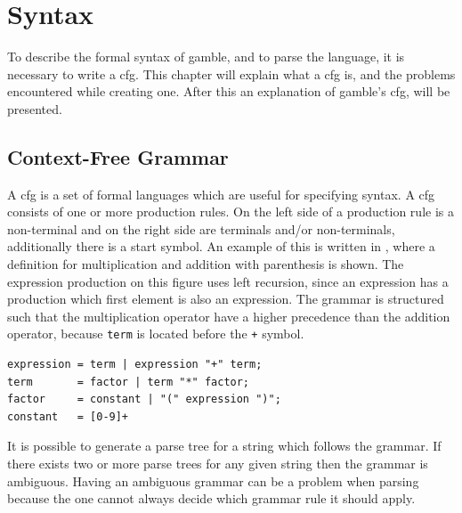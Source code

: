 \chapter{Syntax}\label{chap:syntax}

To describe the formal syntax of \gls{gamble}, and to parse the language, it is necessary to write a \acrfull{cfg}.
This chapter will explain what a \acrshort{cfg} is, and the problems encountered while creating one.
After this an explanation of \gls{gamble}'s \acrshort{cfg}, will be presented.

\section{Context-Free Grammar}\label{sec:cfg}
A \acrshort{cfg} is a set of formal languages which are useful for specifying syntax. 
A \acrshort{cfg} consists of one or more production rules.
On the left side of a production rule is a non-terminal and on the right side are terminals and/or non-terminals, additionally there is a start symbol.
An example of this is written in , where a definition for multiplication and addition with parenthesis is shown.
The expression production on this figure uses left recursion, since an expression has a production which first element is also an expression.
The grammar is structured such that the multiplication operator have a higher precedence than the addition operator, because \texttt{term} is located before the \texttt{+} symbol.

\begin{lstlisting}[caption={An example of a \acrshort{cfg} written in \acrshort{ebnf}, with \acrshort{regex} for defining numbers. },frame=tlrb,label={lst:cfglst1},numbers=none]
expression = term | expression "+" term;
term       = factor | term "*" factor;
factor     = constant | "(" expression ")";
constant   = [0-9]+
\end{lstlisting}

It is possible to generate a parse tree for a string which follows the grammar. 
If there exists two or more parse trees for any given string then the grammar is ambiguous. 
Having an ambiguous grammar can be a problem when parsing because the one cannot always decide which grammar rule it should apply. 


